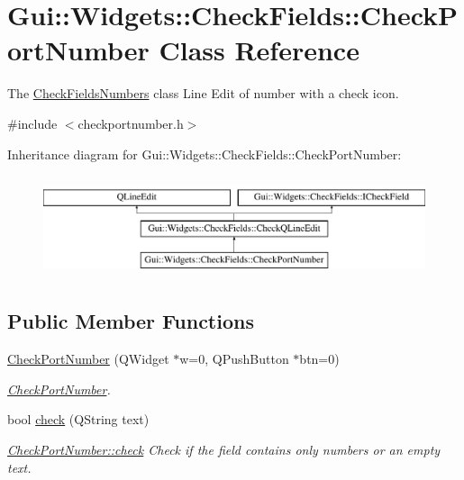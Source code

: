 \hypertarget{classGui_1_1Widgets_1_1CheckFields_1_1CheckPortNumber}{}\section{Gui\+:\+:Widgets\+:\+:Check\+Fields\+:\+:Check\+Port\+Number Class Reference}
\label{classGui_1_1Widgets_1_1CheckFields_1_1CheckPortNumber}


The \hyperlink{classGui_1_1Widgets_1_1CheckFields_1_1CheckFieldsNumbers}{Check\+Fields\+Numbers} class Line Edit of number with a check icon.  




{\ttfamily \#include $<$checkportnumber.\+h$>$}

Inheritance diagram for Gui\+:\+:Widgets\+:\+:Check\+Fields\+:\+:Check\+Port\+Number\+:\begin{figure}[H]
\begin{center}
\leavevmode
\includegraphics[height=3.000000cm]{d5/d41/classGui_1_1Widgets_1_1CheckFields_1_1CheckPortNumber}
\end{center}
\end{figure}
\subsection*{Public Member Functions}
\begin{DoxyCompactItemize}
\item 
\hyperlink{classGui_1_1Widgets_1_1CheckFields_1_1CheckPortNumber_a587504802ee5cdc0529c411b45d50ee9}{Check\+Port\+Number} (Q\+Widget $\ast$w=0, Q\+Push\+Button $\ast$btn=0)
\begin{DoxyCompactList}\small\item\em \hyperlink{classGui_1_1Widgets_1_1CheckFields_1_1CheckPortNumber}{Check\+Port\+Number}. \end{DoxyCompactList}\item 
bool \hyperlink{classGui_1_1Widgets_1_1CheckFields_1_1CheckPortNumber_aca2bfa31e06451c77a7a38020c2819b7}{check} (Q\+String text)
\begin{DoxyCompactList}\small\item\em \hyperlink{classGui_1_1Widgets_1_1CheckFields_1_1CheckPortNumber_aca2bfa31e06451c77a7a38020c2819b7}{Check\+Port\+Number\+::check} Check if the field contains only numbers or an empty text. \end{DoxyCompactList}\end{DoxyCompactItemize}
